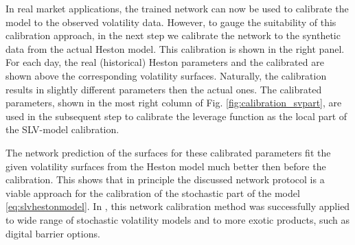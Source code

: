 \documentclass[
a4paper,     %
12pt           %
]{scrartcl}  %
\numberwithin{equation}{section}
\begin{document}
In real market applications, the trained network can now be used to calibrate the model to the observed volatility data. However, to gauge the suitability of this calibration approach, in the next step we calibrate the network to the synthetic data from the actual Heston model. This calibration is shown in the right panel. For each day, the real (historical) Heston parameters and the calibrated are shown above the corresponding volatility surfaces. Naturally, the calibration results in slightly different parameters then the actual ones. The calibrated parameters, shown in the most right column of Fig. \ref{fig:calibration_svpart}, are used in the subsequent step to calibrate the leverage function as the local part of the SLV-model calibration.

The network prediction of the surfaces for these calibrated parameters fit the given volatility surfaces from the Heston model much better then before the calibration. This shows that in principle the discussed network protocol is a viable approach for the calibration of the stochastic part of the model \eqref{eq:slvhestonmodel}. In \cite{horvath_deep_2019}, this network calibration method was successfully applied to wide range of stochastic volatility models and to more exotic products, such as digital barrier options.
\end{document}
